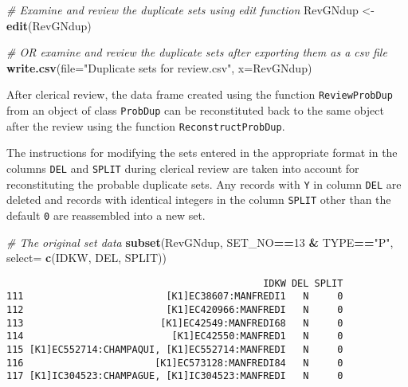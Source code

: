\documentclass[
]{article}
\newenvironment{Shaded}{\begin{snugshade}}{\end{snugshade}}
\newcommand{\CommentTok}[1]{\textcolor[rgb]{0.56,0.35,0.01}{\textit{#1}}}
\newcommand{\DataTypeTok}[1]{\textcolor[rgb]{0.13,0.29,0.53}{#1}}
\newcommand{\DecValTok}[1]{\textcolor[rgb]{0.00,0.00,0.81}{#1}}
\newcommand{\KeywordTok}[1]{\textcolor[rgb]{0.13,0.29,0.53}{\textbf{#1}}}
\newcommand{\NormalTok}[1]{#1}
\newcommand{\OperatorTok}[1]{\textcolor[rgb]{0.81,0.36,0.00}{\textbf{#1}}}
\newcommand{\StringTok}[1]{\textcolor[rgb]{0.31,0.60,0.02}{#1}}
\begin{document}
\begin{Shaded}
\begin{Highlighting}[]
\CommentTok{# Examine and review the duplicate sets using edit function}
\NormalTok{RevGNdup <-}\StringTok{ }\KeywordTok{edit}\NormalTok{(RevGNdup)}

\CommentTok{# OR examine and review the duplicate sets after exporting them as a csv file}
\KeywordTok{write.csv}\NormalTok{(}\DataTypeTok{file=}\StringTok{"Duplicate sets for review.csv"}\NormalTok{, }\DataTypeTok{x=}\NormalTok{RevGNdup)}
\end{Highlighting}
\end{Shaded}

After clerical review, the data frame created using the function
\texttt{ReviewProbDup} from an object of class \texttt{ProbDup} can be
reconstituted back to the same object after the review using the
function \texttt{ReconstructProbDup}.

The instructions for modifying the sets entered in the appropriate
format in the columns \texttt{DEL} and \texttt{SPLIT} during clerical
review are taken into account for reconstituting the probable duplicate
sets. Any records with \texttt{Y} in column \texttt{DEL} are deleted and
records with identical integers in the column \texttt{SPLIT} other than
the default \texttt{0} are reassembled into a new set.

\begin{Shaded}
\begin{Highlighting}[]
\CommentTok{# The original set data}
\KeywordTok{subset}\NormalTok{(RevGNdup, SET_NO}\OperatorTok{==}\DecValTok{13} \OperatorTok{&}\StringTok{ }\NormalTok{TYPE}\OperatorTok{==}\StringTok{"P"}\NormalTok{, }\DataTypeTok{select=} \KeywordTok{c}\NormalTok{(IDKW, DEL, SPLIT))}
\end{Highlighting}
\end{Shaded}

\begin{verbatim}
                                             IDKW DEL SPLIT
111                         [K1]EC38607:MANFREDI1   N     0
112                         [K1]EC420966:MANFREDI   N     0
113                        [K1]EC42549:MANFREDI68   N     0
114                          [K1]EC42550:MANFRED1   N     0
115 [K1]EC552714:CHAMPAQUI, [K1]EC552714:MANFREDI   N     0
116                       [K1]EC573128:MANFREDI84   N     0
117 [K1]IC304523:CHAMPAGUE, [K1]IC304523:MANFREDI   N     0
\end{verbatim}
\end{document}
